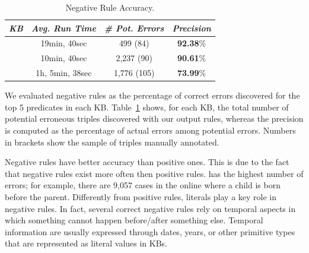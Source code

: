 \vspace{-1ex}
\begin{table}[htb]
	\centering
	\caption{\krd Negative Rule Accuracy.}
			\vspace{-2ex}
	\label{tab:neg_rules_acc}
	\begin{small}
	\begin{tabular}{|c|c|c|c|}
		\hline
		\hline
		{\it KB}&{\it Avg. Run Time}&{\it \# Pot. Errors} & {\it Precision} \tabularnewline
		\hline
		\dbpedia & 19min, 40sec& 499 (84) & \textbf{92.38}\%\tabularnewline
		\yago 3 & 10min, 40sec & 2,237 (90) & \textbf{90.61}\%\tabularnewline
		\wikidata & 1h, 5min, 38sec & 1,776 (105)& \textbf{73.99}\%\tabularnewline
		\hline
	\end{tabular}
	\end{small}
\end{table}

We evaluated negative rules as the percentage of correct errors discovered for the top 5 predicates in each KB. Table~\ref{tab:neg_rules_acc} shows, for each KB, the total number of potential erroneous triples discovered with our output rules, whereas the precision is computed as the percentage of actual errors among potential errors. Numbers in brackets show the sample of %
triples manually annotated.

Negative rules have better accuracy than positive ones. 
This is due to the fact that negative rules exist more often then positive rules.
 \yago has the highest number of errors; for example, there are 9,057 cases in the online \yago where a child is born before the parent. 
%
Differently from positive rules, literals play a key role in negative rules. In fact, several correct negative rules rely on temporal aspects in which something cannot happen before/after something else. Temporal information are usually expressed through dates, years, or other primitive types that are represented as literal values in KBs.

